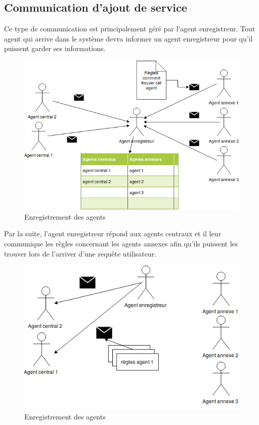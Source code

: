 \subsection{Communication d'ajout de service}
Ce type de communication est principalement géré par l’agent enregistreur. Tout agent qui arrive dans le système devra  informer un agent enregistreur pour qu’il puissent garder ses informations.
\begin{figure}[H]
	\centering
	\includegraphics[scale=0.6]{imgs/comReg.png}
	\caption{Enregistrement des agents}
	\label{fig:registrations}
\end{figure}
Par la suite, l’agent enregistreur répond aux agents centraux et il leur communique les règles concernant les agents annexes afin qu’ils puissent les trouver lors de l’arriver d’une requête utilisateur.
\begin{figure}[H]
	\centering
	\includegraphics[scale=0.6]{imgs/sendRules.png}
	\caption{Enregistrement des agents}
	\label{fig:comRules}
\end{figure}
